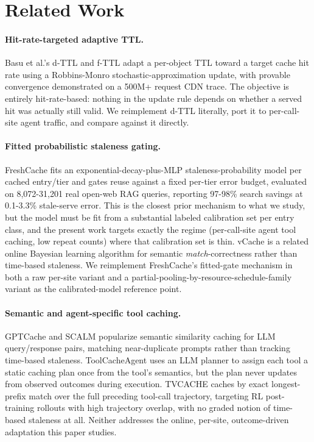 \documentclass[11pt,letterpaper]{article}
\begin{document}
\section{Related Work}

\paragraph{Hit-rate-targeted adaptive TTL.} Basu et al.'s d-TTL and f-TTL \citep{Basu2017} adapt a per-object TTL toward a
target cache hit rate using a Robbins-Monro stochastic-approximation update, with provable convergence
demonstrated on a 500M+ request CDN trace. The objective is entirely hit-rate-based: nothing in the update
rule depends on whether a served hit was actually still valid. We reimplement d-TTL literally, port it to
per-call-site agent traffic, and compare against it directly.

\paragraph{Fitted probabilistic staleness gating.} FreshCache \citep{Mansoor2026} fits an exponential-decay-plus-MLP
staleness-probability model per cached entry/tier and gates reuse against a fixed per-tier error budget,
evaluated on 8,072-31,201 real open-web RAG queries, reporting 97-98\% search savings at 0.1-3.3\%
stale-serve error. This is the closest prior mechanism to what we study, but the model must be fit from a
substantial labeled calibration set per entry class, and the present work targets exactly the regime
(per-call-site agent tool caching, low repeat counts) where that calibration set is thin. vCache \citep{Schroeder2025} is a
related online Bayesian learning algorithm for semantic \emph{match}-correctness rather than time-based
staleness. We reimplement FreshCache's fitted-gate mechanism in both a raw per-site variant and a
partial-pooling-by-resource-schedule-family variant as the calibrated-model reference point.

\paragraph{Semantic and agent-specific tool caching.} GPTCache \citep{Bang2023} and SCALM \citep{Li2024} popularize semantic
similarity caching for LLM query/response pairs, matching near-duplicate prompts rather than tracking
time-based staleness. ToolCacheAgent \citep{ToolCacheAgent2026} uses an LLM planner to assign each tool a static caching plan once
from the tool's semantics, but the plan never updates from observed outcomes during execution. TVCACHE \citep{Kumar2026}
caches by exact longest-prefix match over the full preceding tool-call trajectory, targeting RL
post-training rollouts with high trajectory overlap, with no graded notion of time-based staleness at all.
Neither addresses the online, per-site, outcome-driven adaptation this paper studies.
\end{document}
